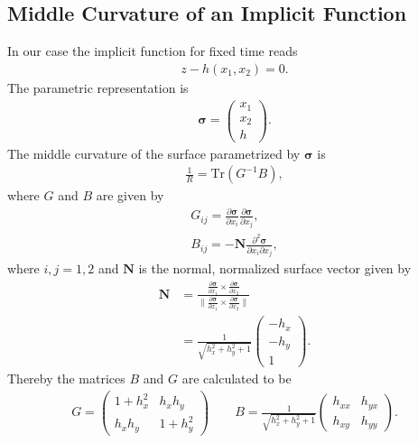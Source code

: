\subsection{Middle Curvature of an Implicit Function}
\label{appendix:curvature}
In our case the implicit function for fixed time reads
\begin{align}
    z-h\left(x_1,x_2\right) = 0.
\end{align}
The parametric representation is
\begin{align}
    \mathbf{\sigma} = \begin{pmatrix} x_1 \\ x_2 \\ h \end{pmatrix} .
\end{align}
The middle curvature of the surface parametrized by $\mathbf{\sigma}$ is
\begin{align}
    \frac{1}{R} = \text{Tr}(G^{-1}B),
\end{align}
where $G$ and $B$ are given by
\begin{align}
    G_{ij} = \frac{\partial \mathbf{\sigma}}{\partial x_i} \frac{\partial
    \mathbf{\sigma}}{\partial x_j}, \\
    B_{ij} = -\mathbf{N} \frac{\partial^2 \mathbf{\sigma}}{\partial
    x_i\partial x_j},
\end{align}
where $i, j = 1, 2$ and $\mathbf{N}$ is the normal, normalized surface vector given by
\begin{align}
    \mathbf{N} &= \frac{\frac{\partial \mathbf{\sigma}}{\partial x_1}\times
    \frac{\partial \mathbf{\sigma}}{\partial x_2}}{\|\frac{\partial \mathbf{\sigma}}{\partial x_1}\times
    \frac{\partial \mathbf{\sigma}}{\partial x_2}\|} \\
               &= \frac{1}{\sqrt{h_x^2 + h_y^2 +1}} \begin{pmatrix}
               -h_x\\-h_y\\1 \end{pmatrix}.
\end{align}
Thereby the matrices $B$ and $G$ are calculated to be
\begin{align}
    G = \begin{pmatrix} 1+h_x^2 & h_xh_y\\h_xh_y & 1+h_y^2 \end{pmatrix}
    \qquad
    B =\frac{1}{\sqrt{h_x^2 +h_y^2 +1} } \begin{pmatrix}h_{x x} &
    h_{yx}\\h_{x y} & h_{yy}  \end{pmatrix}.
\end{align}
